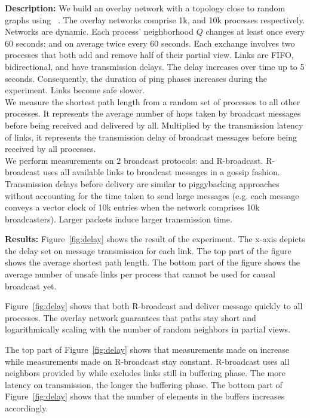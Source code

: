 \noindent \textbf{Description:} We build an overlay network with a topology
close to random graphs using \SPRAY~\cite{nedelec2017adaptive}. The overlay
networks comprise 1k, and 10k processes respectively. Networks are dynamic. Each
process' neighborhood $Q$ changes at least once every 60 seconds; and on average
twice every 60 seconds. Each exchange involves two processes that both add and
remove half of their partial view.  Links are FIFO, bidirectional, and have
transmission delays. The delay increases over time up to 5 seconds.
Consequently, the duration of ping phases increases during the experiment.
Links become safe slower. \\
We measure the shortest path length from a random set of processes to all other
processes. It represents the average number of hops taken by broadcast messages
before being received and delivered by all.  Multiplied by the transmission
latency of links, it represents the transmission delay of broadcast
messages before being received by all processes. \\
We perform measurements on 2 broadcast protocols: \CBROADCAST and R-broadcast.
R-broadcast uses all available links to broadcast messages in a gossip fashion.
Transmission delays before delivery are similar to piggybacking
approaches~\cite{almeida2008interval,fidge1988timestamps,mattern1989virtual,singhal1992efficient,birman1987reliable,hadzilacos1993fault,mostefaoui2017probabilistic}
without accounting for the time taken to send large messages (e.g. each message
conveys a vector clock of 10k entries when the network comprises 10k broadcasters).
Larger packets induce larger transmission time.

\noindent \textbf{Results:} Figure~\ref{fig:delay} shows the result of the
experiment. The x-axis depicts the delay set on message transmission for each
link. The top part of the figure shows the average shortest path length. The
bottom part of the figure shows the average number of unsafe links per process
that cannot be used for causal broadcast yet.

\noindent Figure~\ref{fig:delay} shows that both R-broadcast and \CBROADCAST deliver
  message quickly to all processes. The overlay network guarantees that paths
  stay short and logarithmically scaling with the number of random neighbors in
  partial views.

\noindent The top part of Figure~\ref{fig:delay} shows that measurements made on
  \CBROADCAST increase while measurements made on R-broadcast stay
  constant. R-broadcast uses all neighbors provided by \SPRAY while \CBROADCAST
  excludes links still in buffering phase. The more latency on transmission, the
  longer the buffering phase. The bottom part of Figure~\ref{fig:delay} shows
  that the number of elements in the buffers increases accordingly.

